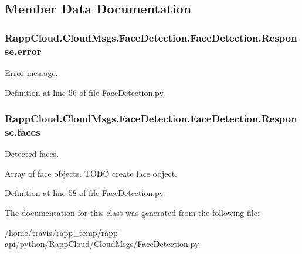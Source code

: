 \subsection{Member Data Documentation}
\hypertarget{classRappCloud_1_1CloudMsgs_1_1FaceDetection_1_1FaceDetection_1_1Response_a0758497d0c6a4c106cfe5e0ac1185a6a}{
\subsubsection[{error}]{\setlength{\rightskip}{0pt plus 5cm}Rapp\-Cloud.\-Cloud\-Msgs.\-Face\-Detection.\-Face\-Detection.\-Response.\-error}}\label{classRappCloud_1_1CloudMsgs_1_1FaceDetection_1_1FaceDetection_1_1Response_a0758497d0c6a4c106cfe5e0ac1185a6a}


Error message. 



Definition at line 56 of file Face\-Detection.\-py.

\hypertarget{classRappCloud_1_1CloudMsgs_1_1FaceDetection_1_1FaceDetection_1_1Response_af5a074841fa3011285a5fb5517feb249}{
\subsubsection[{faces}]{\setlength{\rightskip}{0pt plus 5cm}Rapp\-Cloud.\-Cloud\-Msgs.\-Face\-Detection.\-Face\-Detection.\-Response.\-faces}}\label{classRappCloud_1_1CloudMsgs_1_1FaceDetection_1_1FaceDetection_1_1Response_af5a074841fa3011285a5fb5517feb249}


Detected faces. 

Array of face objects. T\-O\-D\-O create face object. 

Definition at line 58 of file Face\-Detection.\-py.



The documentation for this class was generated from the following file\-:\begin{DoxyCompactItemize}
\item 
/home/travis/rapp\-\_\-temp/rapp-\/api/python/\-Rapp\-Cloud/\-Cloud\-Msgs/\hyperlink{FaceDetection_8py}{Face\-Detection.\-py}\end{DoxyCompactItemize}
